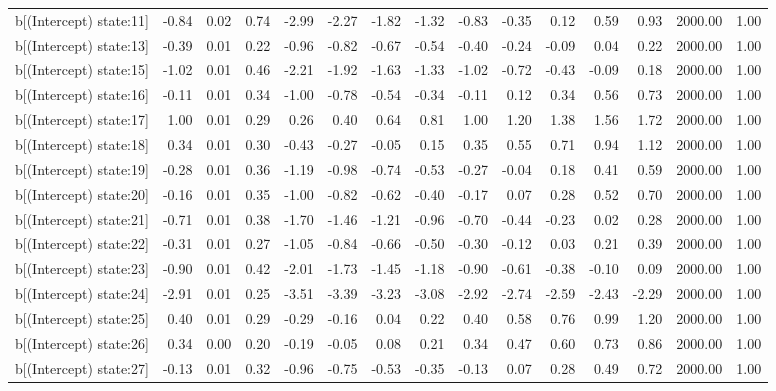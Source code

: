 \begin{table}[ht]
\begin{tabular}{rrrrrrrrrrrrrrr}
  b[(Intercept) state:11] & -0.84 & 0.02 & 0.74 & -2.99 & -2.27 & -1.82 & -1.32 & -0.83 & -0.35 & 0.12 & 0.59 & 0.93 & 2000.00 & 1.00 \\ 
  b[(Intercept) state:13] & -0.39 & 0.01 & 0.22 & -0.96 & -0.82 & -0.67 & -0.54 & -0.40 & -0.24 & -0.09 & 0.04 & 0.22 & 2000.00 & 1.00 \\ 
  b[(Intercept) state:15] & -1.02 & 0.01 & 0.46 & -2.21 & -1.92 & -1.63 & -1.33 & -1.02 & -0.72 & -0.43 & -0.09 & 0.18 & 2000.00 & 1.00 \\ 
  b[(Intercept) state:16] & -0.11 & 0.01 & 0.34 & -1.00 & -0.78 & -0.54 & -0.34 & -0.11 & 0.12 & 0.34 & 0.56 & 0.73 & 2000.00 & 1.00 \\ 
  b[(Intercept) state:17] & 1.00 & 0.01 & 0.29 & 0.26 & 0.40 & 0.64 & 0.81 & 1.00 & 1.20 & 1.38 & 1.56 & 1.72 & 2000.00 & 1.00 \\ 
  b[(Intercept) state:18] & 0.34 & 0.01 & 0.30 & -0.43 & -0.27 & -0.05 & 0.15 & 0.35 & 0.55 & 0.71 & 0.94 & 1.12 & 2000.00 & 1.00 \\ 
  b[(Intercept) state:19] & -0.28 & 0.01 & 0.36 & -1.19 & -0.98 & -0.74 & -0.53 & -0.27 & -0.04 & 0.18 & 0.41 & 0.59 & 2000.00 & 1.00 \\ 
  b[(Intercept) state:20] & -0.16 & 0.01 & 0.35 & -1.00 & -0.82 & -0.62 & -0.40 & -0.17 & 0.07 & 0.28 & 0.52 & 0.70 & 2000.00 & 1.00 \\ 
  b[(Intercept) state:21] & -0.71 & 0.01 & 0.38 & -1.70 & -1.46 & -1.21 & -0.96 & -0.70 & -0.44 & -0.23 & 0.02 & 0.28 & 2000.00 & 1.00 \\ 
  b[(Intercept) state:22] & -0.31 & 0.01 & 0.27 & -1.05 & -0.84 & -0.66 & -0.50 & -0.30 & -0.12 & 0.03 & 0.21 & 0.39 & 2000.00 & 1.00 \\ 
  b[(Intercept) state:23] & -0.90 & 0.01 & 0.42 & -2.01 & -1.73 & -1.45 & -1.18 & -0.90 & -0.61 & -0.38 & -0.10 & 0.09 & 2000.00 & 1.00 \\ 
  b[(Intercept) state:24] & -2.91 & 0.01 & 0.25 & -3.51 & -3.39 & -3.23 & -3.08 & -2.92 & -2.74 & -2.59 & -2.43 & -2.29 & 2000.00 & 1.00 \\ 
  b[(Intercept) state:25] & 0.40 & 0.01 & 0.29 & -0.29 & -0.16 & 0.04 & 0.22 & 0.40 & 0.58 & 0.76 & 0.99 & 1.20 & 2000.00 & 1.00 \\ 
  b[(Intercept) state:26] & 0.34 & 0.00 & 0.20 & -0.19 & -0.05 & 0.08 & 0.21 & 0.34 & 0.47 & 0.60 & 0.73 & 0.86 & 2000.00 & 1.00 \\ 
  b[(Intercept) state:27] & -0.13 & 0.01 & 0.32 & -0.96 & -0.75 & -0.53 & -0.35 & -0.13 & 0.07 & 0.28 & 0.49 & 0.72 & 2000.00 & 1.00 \\ 

\end{tabular}
\end{table}
